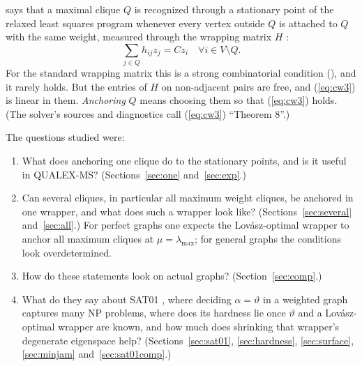\documentclass[11pt]{article}
\theoremstyle{definition}
\theoremstyle{remark}
\newcommand{\lmax}{\lambda_{\max}}
\begin{document}
\cite[Theorem~2]{CW} says that a maximal clique $Q$ is recognized through
a stationary point of the relaxed least squares program \cite[(7)]{CW} whenever
every vertex outside $Q$ is attached to $Q$ with the same weight, measured
through the wrapping matrix $H$ \cite[(6)]{CW}:
\begin{equation}
\label{eq:cw3}
\sum_{j \in Q} h_{ij} z_j = C z_i \quad \forall i \in V\setminus Q.
\end{equation}
For the standard wrapping matrix this is a strong combinatorial condition
(\cite[Corollary~1]{CW}), and it rarely holds. But the entries of $H$ on
non-adjacent pairs are free, and (\ref{eq:cw3}) is linear in them. {\em
Anchoring} $Q$ means choosing them so that (\ref{eq:cw3}) holds. (The
solver's sources and diagnostics call (\ref{eq:cw3}) ``Theorem 8''.)

The questions studied were:
\begin{enumerate}
\item What does anchoring one clique do to the stationary points, and is
it useful in QUALEX-MS? (Sections~\ref{sec:one} and~\ref{sec:exp}.)
\item Can several cliques, in particular all maximum weight cliques, be
anchored in one wrapper, and what does such a wrapper look like?
(Sections~\ref{sec:several} and~\ref{sec:all}.) For perfect graphs one
expects the Lov\'asz-optimal wrapper to anchor all maximum cliques at
$\mu=\lmax$; for general graphs the conditions look overdetermined.
\item How do these statements look on actual graphs?
(Section~\ref{sec:comp}.)
\item What do they say about SAT01 \cite{Bu07}, where deciding
$\alpha=\vartheta$ in a weighted graph captures many NP problems, where
does its hardness lie once $\vartheta$ and a Lov\'asz-optimal wrapper are
known, and how much does shrinking that wrapper's degenerate eigenspace
help? (Sections~\ref{sec:sat01}, \ref{sec:hardness}, \ref{sec:surface},
\ref{sec:minjam} and~\ref{sec:sat01comp}.)
\end{enumerate}
\end{document}

